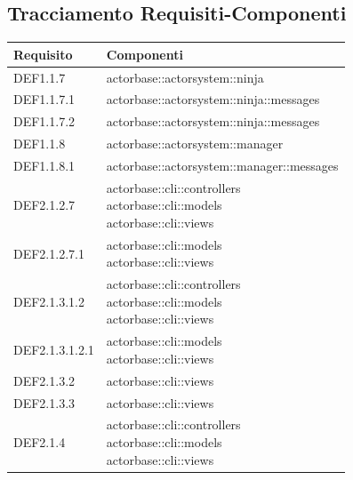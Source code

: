 \documentclass{scalatekids-article}
\begin{document}
\subsection{Tracciamento Requisiti-Componenti}

\begin{longtable}[H]{|p{3.5cm}|p{7.5cm}|}
  \hline
  \textbf{Requisito} & \textbf{Componenti}\\
  \hline
  DEF1.1.7 & \multiLineCell[t]{actorbase::actorsystem::ninja\\}\\
  \hline
  DEF1.1.7.1 & \multiLineCell[t]{actorbase::actorsystem::ninja::messages\\}\\
  \hline
  DEF1.1.7.2 & \multiLineCell[t]{actorbase::actorsystem::ninja::messages\\}\\
  \hline
  DEF1.1.8 & \multiLineCell[t]{actorbase::actorsystem::manager\\}\\
  \hline
  DEF1.1.8.1 & \multiLineCell[t]{actorbase::actorsystem::manager::messages\\}\\
  \hline
  DEF2.1.2.7 & \multiLineCell[t]{actorbase::cli::controllers\\actorbase::cli::models\\actorbase::cli::views\\}\\
  \hline
  DEF2.1.2.7.1 & \multiLineCell[t]{actorbase::cli::models\\actorbase::cli::views\\}\\
  \hline
  DEF2.1.3.1.2 & \multiLineCell[t]{actorbase::cli::controllers\\actorbase::cli::models\\actorbase::cli::views\\}\\
  \hline
  DEF2.1.3.1.2.1 & \multiLineCell[t]{actorbase::cli::models\\actorbase::cli::views\\}\\
  \hline
  DEF2.1.3.2 & \multiLineCell[t]{actorbase::cli::views\\}\\
  \hline
  DEF2.1.3.3 & \multiLineCell[t]{actorbase::cli::views\\}\\
  \hline
  DEF2.1.4 & \multiLineCell[t]{actorbase::cli::controllers\\actorbase::cli::models\\actorbase::cli::views\\}\\

\end{longtable}
\end{document}
